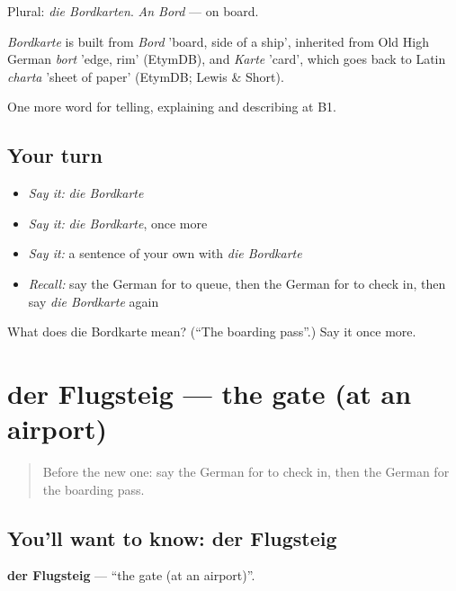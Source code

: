 Plural: \emph{die Bordkarten}. \emph{An Bord} — on board.

\begin{cousinweb}
\emph{Bordkarte} is built from \emph{Bord} 'board, side of a ship', inherited from Old High German \emph{bort} 'edge, rim' (EtymDB), and \emph{Karte} 'card', which goes back to Latin \emph{charta} 'sheet of paper' (EtymDB; Lewis \& Short).
\end{cousinweb}

\begin{grammarlens}[title={What you've built}]
One more word for telling, explaining and describing at B1.
\end{grammarlens}

\subsection*{Your turn}
\begin{itemize}
\raggedright
  \item \emph{Say it:} \emph{die Bordkarte}
  \item \emph{Say it:} \emph{die Bordkarte}, once more
  \item \emph{Say it:} a sentence of your own with \emph{die Bordkarte}
  \item \emph{Recall:} say the German for to queue, then the German for to check in, then say \emph{die Bordkarte} again
\end{itemize}

\begin{tcolorbox}[breakable,colback=teal!4,colframe=teal!35!black,title={Before you move on}]
What does die Bordkarte mean? (\textquotedblleft{}The boarding pass\textquotedblright{}.) Say it once more.
\end{tcolorbox}
\section[der Flugsteig]{der Flugsteig — the gate (at an airport)}

\label{lesson:GE-C416-flugsteig}



\begin{quote}
Before the new one: say the German for to check in, then the German for the boarding pass.
\end{quote}

\subsection*{You'll want to know: der Flugsteig}
\textbf{der Flugsteig} — \textquotedblleft{}the gate (at an airport)\textquotedblright{}.


